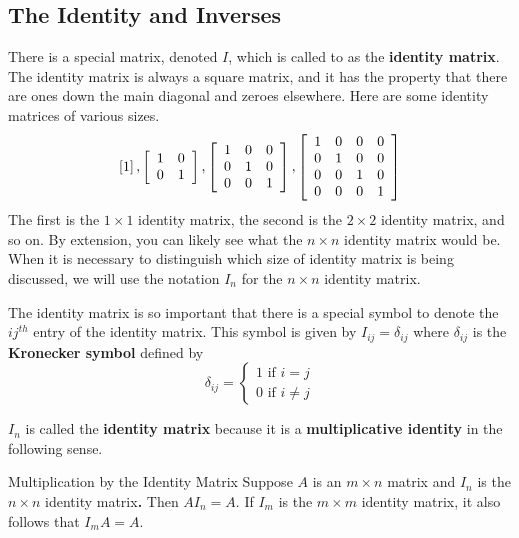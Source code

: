 \subsection{The Identity and Inverses}

There is a special matrix, denoted $I$, which is called
 to as the \textbf{identity matrix}. The identity matrix is always a square
matrix, and it has
the property that there are ones down the main diagonal and zeroes
elsewhere. Here are some identity matrices of various sizes.
\begin{equation*}
\left[ 1\right] ,\left[
\begin{array}{cc}
1 & 0 \\
0 & 1
\end{array}
\right] ,\left[
\begin{array}{ccc}
1 & 0 & 0 \\
0 & 1 & 0 \\
0 & 0 & 1
\end{array}
\right] ,\left[
\begin{array}{cccc}
1 & 0 & 0 & 0 \\
0 & 1 & 0 & 0 \\
0 & 0 & 1 & 0 \\
0 & 0 & 0 & 1
\end{array}
\right] 
\end{equation*}
The first is the $1\times 1$ identity matrix, the second is the $2\times 2$
identity matrix, and so on. By extension, you can likely see
what the $n\times n$ identity matrix would be. When it is necessary to distinguish 
which size of identity matrix is being discussed, we will use the 
notation $I_n$ for the $n \times n$ identity matrix. 

The identity matrix is so important that there
is a special symbol to denote the $ij^{th}$ entry of the identity matrix. This symbol is given by 
$I_{ij}=\delta _{ij}$ where $\delta _{ij}$ is the \textbf{Kronecker symbol}
defined
 by
\begin{equation*}
\delta _{ij}=\left\{
\begin{array}{c}
1
\text{ if }i=j \\
0\text{ if }i\neq j
\end{array}
\right.
\end{equation*}

$I_n$ is called the \textbf{identity matrix} because it is a \textbf{multiplicative identity} in the following sense.

\begin{lemma}{Multiplication by the Identity Matrix}\label{lem:multbyidentity}
Suppose $A$ is an $m\times n$ matrix and $I_{n}$ is the $n\times n$ identity
matrix\textbf{.} Then $AI_{n}=A.$ If $I_{m}$ is the $m\times m$ identity
matrix, it also follows that $I_{m}A=A.$
\end{lemma}

